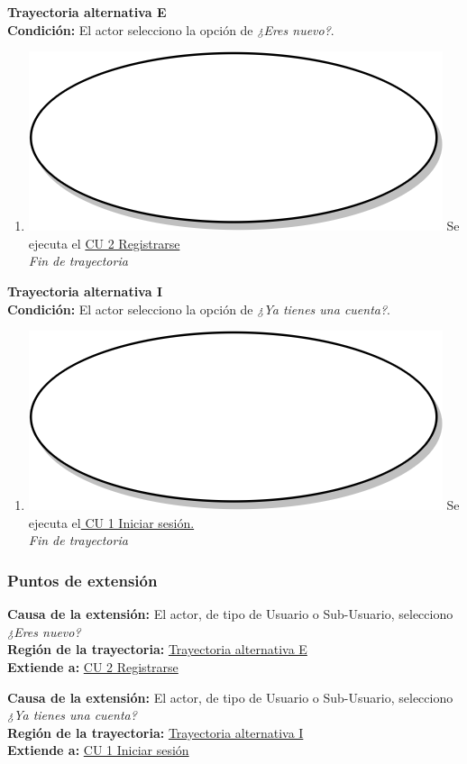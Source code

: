 \textbf{Trayectoria alternativa E} \label{cu1_1_ta_e}\\
\textbf{Condición:} El actor selecciono la opción de \textit{¿Eres nuevo?}.\\
 \begin{enumerate}[label=E\arabic*]
    \item {\includegraphics[scale=.05]{Capitulo3/img/proceso.png} Se ejecuta el \hyperref[cu2]{CU 2 Registrarse}} \\
    \textit{Fin de trayectoria} \\
\end{enumerate}

\textbf{Trayectoria alternativa I} \label{cu1_1_ta_i}\\
\textbf{Condición:} El actor selecciono la opción de \textit{¿Ya tienes una cuenta?}.\\
 \begin{enumerate}[label=I\arabic*]
    \item {\includegraphics[scale=.05]{Capitulo3/img/proceso.png} Se ejecuta el\hyperref[cu1]{ CU 1 Iniciar sesión.}} \\
    \textit{Fin de trayectoria} \\
\end{enumerate}

\subsubsection{Puntos de extensión}
\noindent \textbf{Causa de la extensión:} El actor, de tipo de Usuario o Sub-Usuario, selecciono \textit{¿Eres nuevo?} \\
\textbf{Región de la trayectoria:} \hyperref[cu1_1_ta_e]{Trayectoria alternativa E} \\
\textbf{Extiende a:} \hyperref[cu1_1]{CU 2 Registrarse} \\ \par

\noindent \textbf{Causa de la extensión:} El actor, de tipo de Usuario o Sub-Usuario, selecciono \textit{¿Ya tienes una cuenta?} \\
\textbf{Región de la trayectoria:} \hyperref[cu1_1_ta_i]{Trayectoria alternativa I} \\
\textbf{Extiende a:} \hyperref[cu1]{CU 1 Iniciar sesión}
